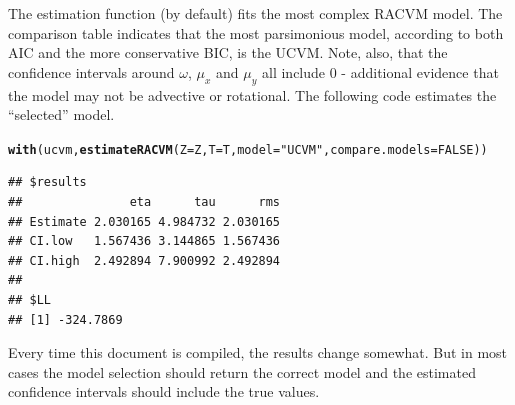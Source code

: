 \documentclass[10pt]{article}\usepackage[]{graphicx}\usepackage[]{color}
\makeatletter
\newcommand{\hlnum}[1]{\textcolor[rgb]{0.686,0.059,0.569}{#1}}%
\newcommand{\hlstr}[1]{\textcolor[rgb]{0.192,0.494,0.8}{#1}}%
\newcommand{\hlstd}[1]{\textcolor[rgb]{0.345,0.345,0.345}{#1}}%
\newcommand{\hlkwc}[1]{\textcolor[rgb]{0.333,0.667,0.333}{#1}}%
\newcommand{\hlkwd}[1]{\textcolor[rgb]{0.737,0.353,0.396}{\textbf{#1}}}%
\newenvironment{kframe}{%
 \def\at@end@of@kframe{}%
 \ifinner\ifhmode%
  \def\at@end@of@kframe{\end{minipage}}%
  \begin{minipage}{\columnwidth}%
 \fi\fi%
 \def\FrameCommand##1{\hskip\@totalleftmargin \hskip-\fboxsep
 \colorbox{shadecolor}{##1}\hskip-\fboxsep
     \hskip-\linewidth \hskip-\@totalleftmargin \hskip\columnwidth}%
 \MakeFramed {\advance\hsize-\width
   \@totalleftmargin\z@ \linewidth\hsize
   \@setminipage}}%
 {\par\unskip\endMakeFramed%
 \at@end@of@kframe}
\newenvironment{knitrout}{}{} %
\makeatother
\begin{document}
\noindent The estimation function (by default) fits the most complex RACVM model.  The comparison table indicates that the most parsimonious model, according to both AIC and the more conservative BIC, is the UCVM.  Note, also, that the confidence intervals around $\omega$, $\mu_x$ and $\mu_y$ all include 0 - additional evidence that the model may not be advective or rotational.  The following code estimates the ``selected'' model.  

\begin{knitrout}
\color{fgcolor}\begin{kframe}
\begin{alltt}
\hlkwd{with}\hlstd{(ucvm,} \hlkwd{estimateRACVM}\hlstd{(}\hlkwc{Z}\hlstd{=Z,} \hlkwc{T}\hlstd{=T,} \hlkwc{model}\hlstd{=}\hlstr{"UCVM"}\hlstd{,} \hlkwc{compare.models}\hlstd{=}\hlnum{FALSE}\hlstd{))}
\end{alltt}
\begin{verbatim}
## $results
##               eta      tau      rms
## Estimate 2.030165 4.984732 2.030165
## CI.low   1.567436 3.144865 1.567436
## CI.high  2.492894 7.900992 2.492894
## 
## $LL
## [1] -324.7869
\end{verbatim}
\end{kframe}
\end{knitrout}

\noindent Every time this document is compiled, the results change somewhat.  But in most cases the model selection should return the correct model and the estimated confidence intervals should include the true values. 
\end{document}

